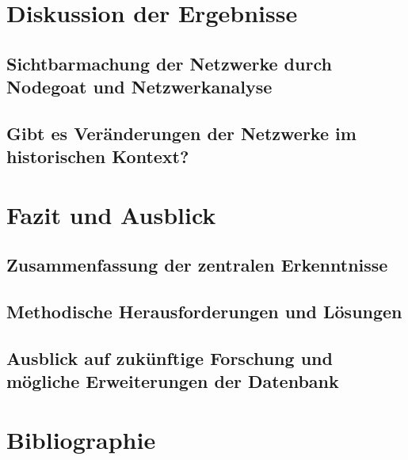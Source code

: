 \documentclass[12pt, a4paper, ngerman, bidi=default]{article}
\begin{document}
\section{Diskussion der Ergebnisse}
  \subsection{Sichtbarmachung der Netzwerke durch Nodegoat und Netzwerkanalyse}
  \subsection{Gibt es Veränderungen der Netzwerke im historischen Kontext?}
  \newpage
\section{Fazit und Ausblick}
\subsection{Zusammenfassung der zentralen Erkenntnisse}
\subsection{Methodische Herausforderungen und Lösungen}
\subsection{Ausblick auf zukünftige Forschung und mögliche Erweiterungen der Datenbank}
\newpage
\section{Bibliographie}


\newpage{}
\end{document}
